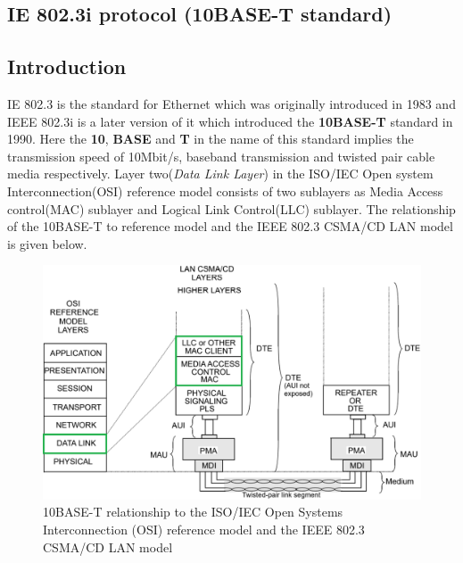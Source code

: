 \documentclass[a4paper,11pt]{article}%
\begin{document}
	

\tableofcontents
\pagebreak


\begin{center}
	\section{IE 802.3i protocol (10BASE-T standard)}
\end{center}


\subsection{Introduction}
IE 802.3 is the standard for Ethernet which was originally introduced in 1983 and IEEE 802.3i is a later version of it which introduced the \textbf{10BASE-T} standard in 1990. Here the \textbf{10}, \textbf{BASE} and \textbf{T} in the name of this standard implies   the transmission speed of 10Mbit/s, baseband transmission and twisted pair cable media respectively. Layer two(\textit{Data Link Layer}) in the ISO/IEC Open system Interconnection(OSI) reference model consists of two sublayers as Media Access control(MAC) sublayer and Logical Link Control(LLC) sublayer. The relationship of the 10BASE-T to reference model and the IEEE 802.3 CSMA/CD LAN model is given below.




	\begin{figure}[!h]
		\centering
		\includegraphics[scale=0.45]{figures/macllc}
		\caption{10BASE-T relationship to the ISO/IEC Open Systems Interconnection (OSI) reference model and the IEEE 802.3 CSMA/CD LAN model\cite{main}}
	\end{figure}
\end{document}
